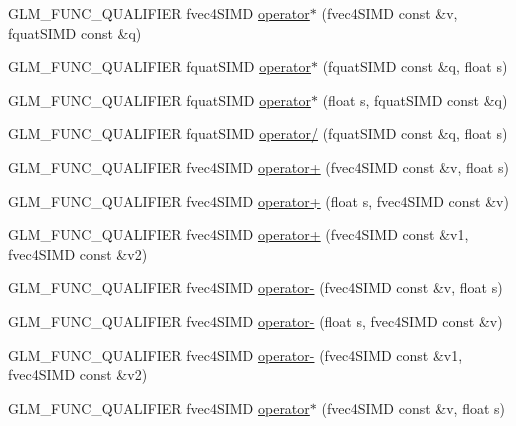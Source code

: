 \begin{DoxyCompactItemize}
G\+L\+M\+\_\+\+F\+U\+N\+C\+\_\+\+Q\+U\+A\+L\+I\+F\+I\+E\+R fvec4\+S\+I\+M\+D \hyperlink{namespaceglm_1_1detail_a8da00ab5a90294ba3a8c7ebcb20a8bed}{operator$\ast$} (fvec4\+S\+I\+M\+D const \&v, fquat\+S\+I\+M\+D const \&q)
\item 
G\+L\+M\+\_\+\+F\+U\+N\+C\+\_\+\+Q\+U\+A\+L\+I\+F\+I\+E\+R fquat\+S\+I\+M\+D \hyperlink{namespaceglm_1_1detail_a828cc0ad293110da78ec58305e89ac3a}{operator$\ast$} (fquat\+S\+I\+M\+D const \&q, float s)
\item 
G\+L\+M\+\_\+\+F\+U\+N\+C\+\_\+\+Q\+U\+A\+L\+I\+F\+I\+E\+R fquat\+S\+I\+M\+D \hyperlink{namespaceglm_1_1detail_a586bbba0bf2940cecf9565510005679a}{operator$\ast$} (float s, fquat\+S\+I\+M\+D const \&q)
\item 
G\+L\+M\+\_\+\+F\+U\+N\+C\+\_\+\+Q\+U\+A\+L\+I\+F\+I\+E\+R fquat\+S\+I\+M\+D \hyperlink{namespaceglm_1_1detail_a242a463e8c91e55fd54ad6a68016e839}{operator/} (fquat\+S\+I\+M\+D const \&q, float s)
\item 
G\+L\+M\+\_\+\+F\+U\+N\+C\+\_\+\+Q\+U\+A\+L\+I\+F\+I\+E\+R fvec4\+S\+I\+M\+D \hyperlink{namespaceglm_1_1detail_a45efa4aad92d96409a70747c0dc60002}{operator+} (fvec4\+S\+I\+M\+D const \&v, float s)
\item 
G\+L\+M\+\_\+\+F\+U\+N\+C\+\_\+\+Q\+U\+A\+L\+I\+F\+I\+E\+R fvec4\+S\+I\+M\+D \hyperlink{namespaceglm_1_1detail_adf78a90e11a6b2bdf419cc04fae5407c}{operator+} (float s, fvec4\+S\+I\+M\+D const \&v)
\item 
G\+L\+M\+\_\+\+F\+U\+N\+C\+\_\+\+Q\+U\+A\+L\+I\+F\+I\+E\+R fvec4\+S\+I\+M\+D \hyperlink{namespaceglm_1_1detail_a015946565bf753ced27292739ae9212d}{operator+} (fvec4\+S\+I\+M\+D const \&v1, fvec4\+S\+I\+M\+D const \&v2)
\item 
G\+L\+M\+\_\+\+F\+U\+N\+C\+\_\+\+Q\+U\+A\+L\+I\+F\+I\+E\+R fvec4\+S\+I\+M\+D \hyperlink{namespaceglm_1_1detail_a2ccde71dbbac0adcfa13ee322d5313eb}{operator-\/} (fvec4\+S\+I\+M\+D const \&v, float s)
\item 
G\+L\+M\+\_\+\+F\+U\+N\+C\+\_\+\+Q\+U\+A\+L\+I\+F\+I\+E\+R fvec4\+S\+I\+M\+D \hyperlink{namespaceglm_1_1detail_aeb2f0978202f5110b6303a3151797240}{operator-\/} (float s, fvec4\+S\+I\+M\+D const \&v)
\item 
G\+L\+M\+\_\+\+F\+U\+N\+C\+\_\+\+Q\+U\+A\+L\+I\+F\+I\+E\+R fvec4\+S\+I\+M\+D \hyperlink{namespaceglm_1_1detail_a2e5e6062fe6a3f295b0f17a9bf4463e0}{operator-\/} (fvec4\+S\+I\+M\+D const \&v1, fvec4\+S\+I\+M\+D const \&v2)
\item 
G\+L\+M\+\_\+\+F\+U\+N\+C\+\_\+\+Q\+U\+A\+L\+I\+F\+I\+E\+R fvec4\+S\+I\+M\+D \hyperlink{namespaceglm_1_1detail_a640fd1bfb152eec121c97429854496cf}{operator$\ast$} (fvec4\+S\+I\+M\+D const \&v, float s)

\end{DoxyCompactItemize}

